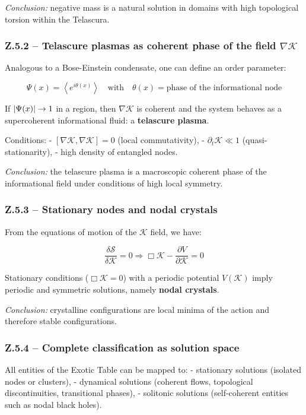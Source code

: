\documentclass[12pt]{article}
\begin{document}
\textit{Conclusion:} negative mass is a natural solution in domains with high topological torsion within the Telascura.

\subsubsection*{Z.5.2 – Telascure plasmas as coherent phase of the field $\nabla \mathcal{K}$}

Analogous to a Bose-Einstein condensate, one can define an order parameter:

\[
\Psi(x) = \left\langle e^{i \theta(x)} \right\rangle
\quad \text{with} \quad
\theta(x) = \text{phase of the informational node}
\]

If $\abs{\Psi(x)} \to 1$ in a region, then $\nabla \mathcal{K}$ is coherent and the system behaves as a supercoherent informational fluid: a \textbf{telascure plasma}.

Conditions:
- $[\nabla \mathcal{K}, \nabla \mathcal{K}] = 0$ (local commutativity),
- $\partial_t \mathcal{K} \ll 1$ (quasi-stationarity),
- high density of entangled nodes.

\textit{Conclusion:} the telascure plasma is a macroscopic coherent phase of the informational field under conditions of high local symmetry.

\subsubsection*{Z.5.3 – Stationary nodes and nodal crystals}

From the equations of motion of the $\mathcal{K}$ field, we have:

\[
\frac{\delta \mathcal{S}}{\delta \mathcal{K}} = 0 \Rightarrow \Box \mathcal{K} - \frac{\partial V}{\partial \mathcal{K}} = 0
\]

Stationary conditions ($\Box \mathcal{K} = 0$) with a periodic potential $V(\mathcal{K})$ imply periodic and symmetric solutions, namely \textbf{nodal crystals}.

\textit{Conclusion:} crystalline configurations are local minima of the action and therefore stable configurations.

\subsubsection*{Z.5.4 – Complete classification as solution space}

All entities of the Exotic Table can be mapped to:
- stationary solutions (isolated nodes or clusters),
- dynamical solutions (coherent flows, topological discontinuities, transitional phases),
- solitonic solutions (self-coherent entities such as nodal black holes).
\end{document}
